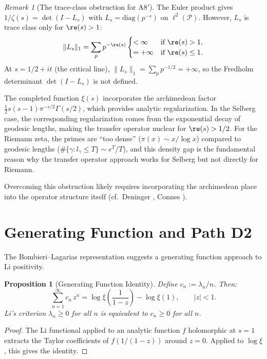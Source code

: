 \documentclass[12pt,a4paper]{article}
\newtheorem{proposition}[theorem]{Proposition}
\theoremstyle{definition}
\theoremstyle{remark}
\newtheorem{remark}[theorem]{Remark}
\newcommand{\PP}{\mathcal{P}}
\begin{document}
\begin{remark}[The trace-class obstruction for A8$'$]\label{rem:trace-class-obstruction}
The Euler product gives $1/\zeta(s) = \det(I - L_s)$ with $L_s = \mathrm{diag}(p^{-s})$ on $\ell^2(\PP)$. However, $L_s$ is trace class only for $\re(s) > 1$:
\[
  \|L_s\|_1 = \sum_p p^{-\re(s)}
  \begin{cases}
    < \infty & \text{if } \re(s) > 1, \\
    = +\infty & \text{if } \re(s) \le 1.
  \end{cases}
\]
At $s = 1/2 + it$ (the critical line), $\|L_s\|_1 = \sum_p p^{-1/2} = +\infty$, so the Fredholm determinant $\det(I - L_s)$ is not defined.

The completed function $\xi(s)$ incorporates the archimedean factor $\frac{1}{2}s(s-1)\pi^{-s/2}\Gamma(s/2)$, which provides analytic regularization. In the Selberg case, the corresponding regularization comes from the exponential decay of geodesic lengths, making the transfer operator nuclear for $\re(s) > 1/2$. For the Riemann zeta, the primes are ``too dense'' ($\pi(x) \sim x/\log x$) compared to geodesic lengths ($\#\{\gamma : l_\gamma \le T\} \sim e^T/T$), and this density gap is the fundamental reason why the transfer operator approach works for Selberg but not directly for Riemann.

Overcoming this obstruction likely requires incorporating the archimedean place into the operator structure itself (cf.\ Deninger \cite{Deninger2002}, Connes \cite{Connes1999}).
\end{remark}

\section{Generating Function and Path D2}\label{sec:path-d2}

The Bombieri--Lagarias representation suggests a generating function approach to Li positivity.

\begin{proposition}[Generating Function Identity]\label{prop:gen-func}
Define $c_n := \lambda_n / n$. Then:
\begin{equation}\label{eq:gen-func}
\sum_{n=1}^{\infty} c_n\, z^n = \log\xi\!\left(\frac{1}{1-z}\right) - \log\xi(1), \qquad |z| < 1.
\end{equation}
Li's criterion $\lambda_n \geq 0$ for all $n$ is equivalent to $c_n \geq 0$ for all $n$.
\end{proposition}
\begin{proof}
The Li functional applied to an analytic function $f$ holomorphic at $s=1$ extracts the Taylor coefficients of $f(1/(1-z))$ around $z=0$. Applied to $\log\xi$, this gives the identity.
\end{proof}
\end{document}
